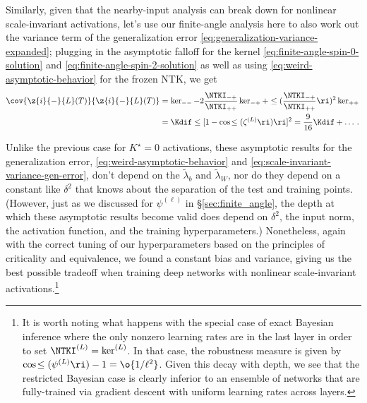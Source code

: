 Similarly, given that the nearby-input analysis can break down for nonlinear scale-invariant activations, let's use our finite-angle analysis here to also work out the variance term of the generalization error \eqref{eq:generalization-variance-expanded}; plugging in the asymptotic falloff for the kernel \eqref{eq:finite-angle-spin-0-solution} and \eqref{eq:finite-angle-spin-2-solution} as well as using \eqref{eq:weird-asymptotic-behavior} for the frozen NTK, we get 
\begin{align}\label{eq:scale-invariant-variance-gen-error}
\cov{\z{i}{-}{L}(T) }{ \z{i}{-}{L}(T)} &=\ker_{--}-2\frac{\NTKI_{-+}}{\NTKI_{++}}\ker_{-+}+\le(\frac{\NTKI_{-+}}{\NTKI_{++}}\ri)^2\ker_{++}\, \\
&= \Kdif \le[1- \cos\!\le(\zeta^{(L)}\ri) \ri]^2=\frac{9}{16}\Kdif+\ldots\, . \notag
\end{align}

Unlike the previous case for $K^\star=0$ activations, these asymptotic results for the generalization error, \eqref{eq:weird-asymptotic-behavior} and \eqref{eq:scale-invariant-variance-gen-error}, don't depend on the  $\widetilde{\lambda}_b$ and $\widetilde{\lambda}_W$, nor do they depend on a constant like $\delta^2$ that knows about the separation of the test and training points. (However, just as we discussed for $\psi^{(\ell)}$ in \S\ref{sec:finite_angle}, the depth at which these asymptotic results become valid does depend on $\delta^2$, the input norm, the activation function, and the training hyperparameters.)
Nonetheless, again with the correct tuning of our hyperparameters based on the principles of criticality and equivalence, we found a constant bias and variance, giving us the best possible tradeoff when training deep networks with nonlinear scale-invariant activations.\footnote{It is worth noting what happens with the special case of exact Bayesian inference where the only nonzero learning rates are in the last layer in order to set $\NTKI^{(L)}=\ker^{(L)}$. In that case, the robustness measure is given by $\cos\!\le(\psi^{(L)}\ri)-1=\o{1/\ell^2}$. Given this decay with depth, we see that the restricted Bayesian case is clearly inferior to an ensemble of networks that are fully-trained via gradient descent with uniform learning rates across layers. %
}

